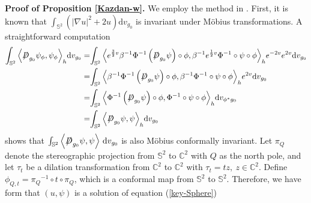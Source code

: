 \documentclass[a4paper, 12pt]{article}
\def\slashiii#1{\setbox0=\hbox{$#1$}#1\hskip-\wd0\hbox to\wd0{\hss\sl/\/\hss}}
\begin{document}
\noindent\textbf{Proof of Proposition \ref{Kazdan-w}. }We employ the method in \cite{MR1131392,changMR0908146}. First, it is known that $\int_{{\mathbb{S}^2}} \left( |\nabla u|^2 + 2u \right) \text{d}v_{g_0}$ is invariant under M\"obius transformations. A straightforward computation
\[
\begin{aligned}
	{\int_{{\mathbb{S}^2}} {\left\langle {{\slashiii{D}_{{g_0}}}{\psi _\phi },{\psi _\phi }} \right\rangle } _h}{\text{d}{v}_{g_0}}  =& {\int_{{\mathbb{S}^2}} {\left\langle {{e^{\frac{3}{2}v}}{\beta ^{ - 1}}{\Phi ^{ - 1}}\left( {{\slashiii{D}_{{g_0}}}\psi } \right) \circ \phi ,{\beta ^{ - 1}}{e^{\frac{1}{2}v}}{\Phi ^{ - 1}} \circ \psi  \circ \phi } \right\rangle } _h}{e^{ - 2v}}{e^{2v}}{\text{d}{v}_{g_0}}  \\
	=& {\int_{{\mathbb{S}^2}} {\left\langle {{\beta ^{ - 1}}{\Phi ^{ - 1}}\left( {{\slashiii{D}_{{g_0}}}\psi } \right) \circ \phi ,{\beta ^{ - 1}}{\Phi ^{ - 1}} \circ \psi  \circ \phi } \right\rangle } _h}{e^{2v}}{\text{d}{v}_{g_0}}  \\
	=& {\int_{{\mathbb{S}^2}} {\left\langle {{\Phi ^{ - 1}}\left( {{\slashiii{D}_{{g_0}}}\psi } \right) \circ \phi ,{\Phi ^{ - 1}} \circ \psi  \circ \phi } \right\rangle } _h}\text{d}{v_{{\phi ^*}{g_0}}}  \\
	=& {\int_{{\mathbb{S}^2}} {\left\langle {{\slashiii{D}_{{g_0}}}\psi ,\psi } \right\rangle } _h}{\text{d}{v}_{g_0}}
\end{aligned} \]
shows that $\int_{\mathbb{S}^2} \left\langle {\slashiii{D}_{g_0}} \psi, \psi \right\rangle \, \text{d}v_{g_0}$ is also  M\"obius conformally invariant. Let \( \pi_Q \) denote the stereographic projection from $\mathbb{S}^2$ to \( \mathbb{C}^2 \) with \( Q \) as the north pole, and let \( \tau_t \) be a dilation transformation from \( \mathbb{C}^2 \) to \( \mathbb{C}^2 \) with $\tau_t=tz,\ z\in \mathbb{C}^2$. Define ${\phi _{Q,t}} = {\pi _Q}^{ - 1} \circ t \circ {\pi _Q}$, which  is a conformal map from $\mathbb{S}^2$ to $\mathbb{S}^2$. Therefore, we have form that $(u,\psi) $ is a solution of equation (\ref{key-Sphere})
\end{document}

